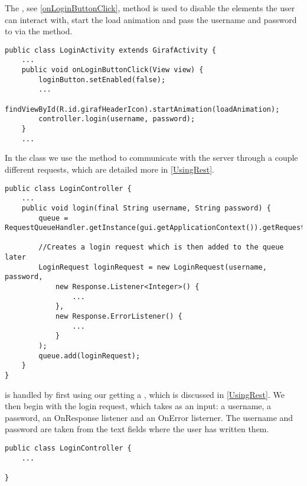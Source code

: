 The , see \autoref{onLoginButtonClick}, method is used
to disable the elements the user can interact with, start the load animation and
pass the username and password to  via the 
method.\nl

\begin{minipage}[H]{\linewidth}
\begin{lstlisting}[caption = The effects of trying to login , label =
onLoginButtonClick] 
public class LoginActivity extends GirafActivity {
	...
	public void onLoginButtonClick(View view) {
        loginButton.setEnabled(false);
 		...
        findViewById(R.id.girafHeaderIcon).startAnimation(loadAnimation);
        controller.login(username, password);
    }
	...
\end{lstlisting}
\end{minipage}

In the  class we use the  method to
communicate with the server through a couple different requests, which are
detailed more in \autoref{UsingRest}.\\




\begin{minipage}[H]{\linewidth}
\begin{lstlisting}[caption = ???, label = loginReq]
public class LoginController {
	...
    public void login(final String username, String password) {
        queue = RequestQueueHandler.getInstance(gui.getApplicationContext()).getRequestQueue();

        //Creates a login request which is then added to the queue later
        LoginRequest loginRequest = new LoginRequest(username, password,
        	new Response.Listener<Integer>() {
        		...
        	},
        	new Response.ErrorListener() {
        		...
        	}
   		);
		queue.add(loginRequest);
	}
}
\end{lstlisting}
\end{minipage}


is handled by first
using our getting a , which is discussed in
\autoref{UsingRest}. We then begin with the login request, which
takes as an input: a username, a password, an OnResponse listener and an OnError listerner. The username and password are taken from the
text fields where the user has written them.

\begin{minipage}[H]{\linewidth}
\begin{lstlisting}[caption = ??? , label = loginController] 
public class LoginController {
	...
	
}
\end{lstlisting}
\end{minipage}

